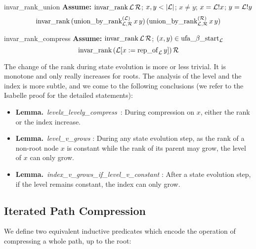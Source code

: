 \documentclass[headsepline,footsepline,footinclude=false,oneside,fontsize=11pt,paper=a4,listof=totoc,bibliography=totoc]{scrbook} %
\begin{document}
\begin{lemma}{invar\_rank\_union}\newline
\textbf{Assume: } $\mathrm{invar\_rank}\,\mathcal{L}\,\mathcal{R}$; $x,y < |\mathcal{L}|$; $x \neq y$; $x = \mathcal{L}!x$; $y = \mathcal{L}!y$
\begin{equation}
\mathrm{invar\_rank}\,(\mathrm{union\_by\_rank^{(\mathcal{L})}_{\mathcal{L},\mathcal{R}}}\, x\,y)\,(\mathrm{union\_by\_rank^{(\mathcal{R})}_{\mathcal{L},\mathcal{R}}}\, x\,y)
\end{equation}
\end{lemma}

\begin{lemma}{invar\_rank\_compress}\newline
\textbf{Assume: } $\mathrm{invar\_rank}\,\mathcal{L}\,\mathcal{R}$; $(x,y) \in \mathrm{ufa\_}\beta\mathrm{\_start}_\mathcal{L}$
\begin{equation}
	\mathrm{invar\_rank}\, (\mathcal{L}[x := \mathrm{rep\_of}_\mathcal{L}\, y])\, \mathcal{R}
\end{equation}
\end{lemma}

The change of the rank during state evolution is more or less trivial. It is monotone and only really increases for roots. The analysis of the level and the index is more subtle, and we come to the following conclusions (we refer to the Isabelle proof for the detailed statements): 
\begin{itemize}
	\item \mbox{\textbf{Lemma.} \textit{levelx\_levely\_compress} \eqnum:} \newline During compression on $x$, either the rank or the index increase. 
	\item \mbox{\textbf{Lemma.} \textit{level\_v\_grows}} \eqnum: \newline During any state evolution step, as the rank of a non-root node $x$ is constant while the rank of its parent may grow, the level of $x$ can only grow.
	\item \mbox{\textbf{Lemma.} \textit{index\_v\_grows\_if\_level\_v\_constant}} \eqnum: \newline After a state evolution step, if the level remains constant, the index can only grow.
\end{itemize}

\subsection{Iterated Path Compression}

We define two equivalent inductive predicates which encode the operation of compressing a whole path, up to the root:
\end{document}
